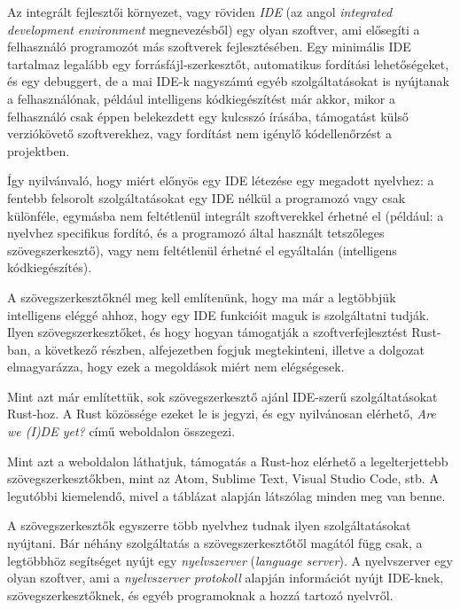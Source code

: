 

Az integrált fejlesztői környezet, vagy röviden \emph{IDE} (az angol \emph{integrated development environment} megnevezésből) 
egy olyan szoftver, ami elősegíti a felhasználó programozót más szoftverek fejlesztésében. 
Egy minimális IDE tartalmaz legalább egy forrásfájl-szerkesztőt, automatikus fordítási lehetőségeket, 
és egy debuggert, de a mai IDE-k nagyszámú egyéb szolgáltatásokat is nyújtanak a felhasználónak, 
például intelligens kódkiegészítést már akkor, mikor a felhasználó csak éppen belekezdett egy kulcsszó írásába, 
támogatást külső verziókövető szoftverekhez, vagy fordítást nem igénylő kódellenőrzést a projektben.

Így nyilvánvaló, hogy miért előnyös egy IDE létezése egy megadott nyelvhez: 
a fentebb felsorolt szolgáltatásokat egy IDE nélkül a programozó vagy csak különféle, egymásba nem feltétlenül integrált szoftverekkel érhetné el 
(például: a nyelvhez specifikus fordító, és a programozó által használt tetszőleges szövegszerkesztő), 
vagy nem feltétlenül érhetné el egyáltalán (intelligens kódkiegészítés).

A szövegszerkesztőknél meg kell említenünk, hogy ma már a legtöbbjük intelligens eléggé ahhoz, 
hogy egy IDE funkcióit maguk is szolgáltatni tudják. Ilyen szövegszerkesztőket, 
és hogy hogyan támogatják a szoftverfejlesztést Rust-ban, a következő részben, 
 alfejezetben fogjuk megtekinteni, illetve a dolgozat elmagyarázza, hogy ezek a megoldások miért nem elégségesek.

\label{sec:ides}

Mint azt már említettük, sok szövegszerkesztő ajánl IDE-szerű szolgáltatásokat Rust-hoz. 
A Rust közössége ezeket le is jegyzi, és egy nyilvánosan elérhető, 
\emph{Are we (I)DE yet?}\cite{ideyet} című weboldalon összegezi.

Mint azt a weboldalon láthatjuk, támogatás a Rust-hoz elérhető a legelterjettebb szövegszerkesztőkben, 
mint az Atom, Sublime Text, Visual Studio Code, stb. 
A legutóbbi kiemelendő, mivel a táblázat alapján látszólag minden meg van benne.

A szövegszerkesztők egyszerre több nyelvhez tudnak ilyen szolgáltatásokat nyújtani. 
Bár néhány szolgáltatás a szövegszerkesztőtől magától függ csak, a legtöbbhöz segítséget nyújt egy \emph{nyelvszerver} (\emph{language server}). 
A nyelvszerver egy olyan szoftver, ami a \emph{nyelvszerver protokoll}\cite{lsp} alapján információt nyújt IDE-knek, szövegszerkesztőknek, és egyéb programoknak a hozzá tartozó nyelvről.

